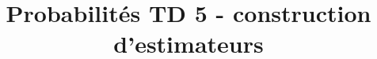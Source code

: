 

\title{Probabilités TD 5 - construction d'estimateurs}

\author{}
\date{}

\newenvironment{solution}
    {\par\vspace{0.5em}\begin{mdframed}[linewidth=0.5pt]\noindent\textbf{Solution :}\par}
    {\end{mdframed}\par\vspace{0.5em}}


\sffamily
\maketitle

